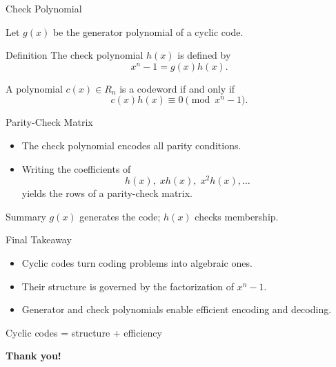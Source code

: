 \documentclass[aspectratio=169,xcolor=dvipsnames]{beamer}
\begin{document}
	\begin{frame}{Check Polynomial}
		
		Let $g(x)$ be the generator polynomial of a cyclic code.
		
		\begin{block}{Definition}
			The \alert{check polynomial} $h(x)$ is defined by
			\[
			x^n - 1 = g(x)h(x).
			\]
		\end{block}
		
		\begin{theorem}
			A polynomial $c(x) \in R_n$ is a codeword if and only if
			\[
			c(x)h(x) \equiv 0 \pmod{x^n - 1}.
			\]
		\end{theorem}
		
	\end{frame}
	
	\begin{frame}{Parity-Check Matrix}
		
		\begin{itemize}
			\item The check polynomial encodes all parity conditions.
			\item Writing the coefficients of
			\[
			h(x),\; xh(x),\; x^2h(x), \dots
			\]
			yields the rows of a parity-check matrix.
		\end{itemize}
		
		\begin{alertblock}{Summary}
			$g(x)$ generates the code; $h(x)$ checks membership.
		\end{alertblock}
		
	\end{frame}
	
	\begin{frame}{Final Takeaway}
		
		\begin{itemize}
			\item Cyclic codes turn coding problems into algebraic ones.
			\item Their structure is governed by the factorization of $x^n - 1$.
			\item Generator and check polynomials enable efficient encoding and decoding.
		\end{itemize}
		
		\begin{center}
			\alert{Cyclic codes = structure + efficiency}
		\end{center}
		
	\end{frame}
	
	\begin{frame}
		\Huge{\centerline{\textbf{Thank you!}}}
	\end{frame}
	
\end{document}
